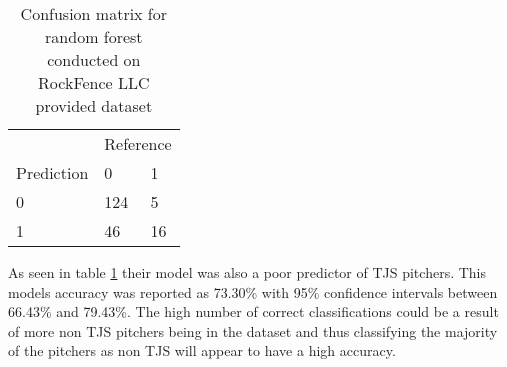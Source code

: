 \begin{table}[h]
\centering
\caption{Confusion matrix for random forest conducted on RockFence LLC provided dataset}
\label{tbl:rockfence}
\begin{tabular}{lll}
           & \multicolumn{2}{l}{Reference} \\
Prediction & 0              & 1            \\
0          & 124            & 5            \\
1          & 46             & 16
\end{tabular}
\end{table}

As seen in table \ref{tbl:rockfence} their model was also a poor predictor of TJS pitchers. This models accuracy was reported as 73.30\% with 95\% confidence intervals between 66.43\% and 79.43\%. The high number of correct classifications could be a result of more non TJS pitchers being in the dataset and thus classifying the majority of the pitchers as non TJS will appear to have a high accuracy.